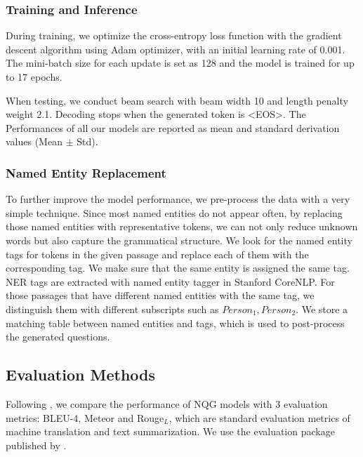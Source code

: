 \documentclass[letterpaper]{article} %
\begin{document}
\subsubsection{Training and Inference}
During training, we optimize the cross-entropy loss function with the gradient descent algorithm using Adam \cite{kingma2014adam} optimizer, with an initial learning rate of 0.001. The mini-batch size for each update is set as 128 and the model is trained for up to 17 epochs. 

When testing, we conduct beam search with beam width 10 and length penalty weight 2.1. Decoding stops when the generated token is  \textless EOS\textgreater{}. The Performances of all our models are reported as mean and standard derivation values (Mean $\pm$ Std).
% 
%    
% 



\subsubsection{Named Entity Replacement}
To further improve the model performance, we pre-process the data with a very simple technique. Since most named entities do not appear often, by replacing those named entities with representative tokens, we can not only reduce unknown words but also capture the grammatical structure. We look for the named entity tags for tokens in the given passage and replace each of them with the corresponding tag. We make sure that the same entity is assigned the same tag. NER tags are extracted with named entity tagger in Stanford CoreNLP. For those passages that have different named entities with the same tag, we distinguish them with different subscripts such as \(Person_1, Person_2\). We store a matching table between named entities and tags, which is used to post-process the generated questions. 



\subsection{Evaluation Methods}
Following \cite{zhou2017neural,song2018leveraging}, we compare the performance of NQG models with 3 evaluation metrics: BLEU-4, Meteor and Rouge\(_L\), which are standard evaluation metrics of machine translation and text summarization. We use the evaluation package published by \cite{chen2015microsoft}.
% 
% 
\end{document}
